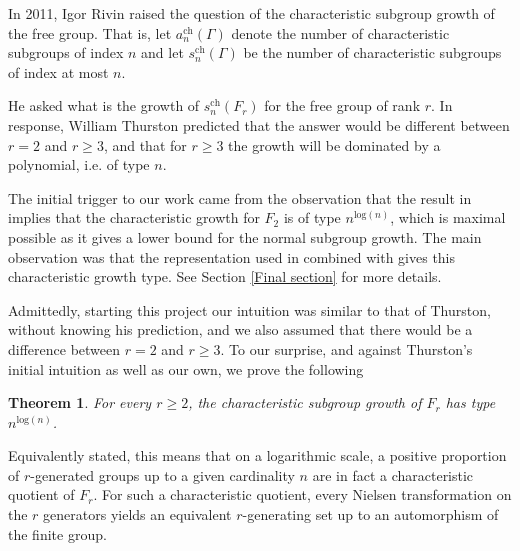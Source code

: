 \documentclass[letterpaper]{amsart}
\newtheorem{theorem}{Theorem}[section]
\begin{document}
In 2011, Igor Rivin \cite{Thurston} raised the question of the characteristic subgroup growth of the free group. That is, let $a_n^\mathrm{ch}(\Gamma)$ denote the number of characteristic subgroups of index $n$ and let $s_n^\mathrm{ch}(\Gamma)$ be the number of characteristic subgroups of index at most $n$.

He asked what is the growth of $s_n^\mathrm{ch}(F_r)$ for the free group of rank $r$. In response, William Thurston \cite{Thurston} predicted that the answer would be different between $r=2$ and $r\geq 3$, and that for $r\geq 3$ the growth will be dominated by a polynomial, i.e. of type $n$.

The initial trigger to our work came from the observation that the result in \cite{chen2025finite} implies that the characteristic growth for $F_2$ is of type $n^{\mathrm{log}(n)}$, which is maximal possible as it gives a lower bound for the normal subgroup growth. The main observation was that the representation used in \cite{chen2025finite} combined with \cite[Theorem B part ii]{larsen2004g2} gives this characteristic growth type. See Section \ref{Final section} for more details.

Admittedly, starting this project our intuition was similar to that of Thurston, without knowing his prediction, and we also assumed that there would be a difference between $r = 2$ and $r \geq 3$. To our surprise, and against Thurston's initial intuition as well as our own, we prove the following
\begin{theorem}
\label{Characteristic Growth of Free Groups}
For every $r \geq 2$, the characteristic subgroup growth of $F_r$ has type $n^{\mathrm{log}(n)}$.
\end{theorem}
Equivalently stated, this means that on a logarithmic scale, a positive proportion of $r$-generated groups up to a given cardinality $n$ are in fact a characteristic quotient of $F_r.$ For such a characteristic quotient, every Nielsen transformation on the $r$ generators yields an equivalent $r$-generating set up to an automorphism of the finite group.
\end{document}
